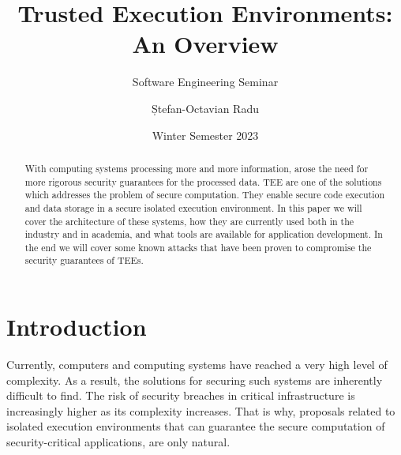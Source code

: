 \documentclass[runningheads,a4paper]{uwsese}
\begin{document}
\mainmatter 

\title{Trusted Execution Environments: An Overview}
\subtitle{Software Engineering Seminar}


\date{Winter Semester 2023}


\author{Ștefan-Octavian Radu}
%


\maketitle

\begin{abstract}

    With computing systems processing more and more information, arose the need
    for more rigorous security guarantees for the processed data. \gls{TEE} are
    one of the solutions which addresses the problem of secure computation. They
    enable secure code execution and data storage in a secure isolated
    execution environment. In this paper we will cover the architecture of
    these systems, how they are currently used both in the industry and in
    academia, and what tools are available for application development. In the
    end we will cover some known attacks that have been proven to compromise
    the security guarantees of \glspl{TEE}.

\end{abstract}


\section{Introduction}

Currently, computers and computing systems have reached a very high level of
complexity. As a result, the solutions for securing such systems are inherently
difficult to find. The risk of security breaches in critical infrastructure is
increasingly higher as its complexity increases. That is why, proposals related
to isolated execution environments that can guarantee the secure computation of
security-critical applications, are only natural.
\end{document}
